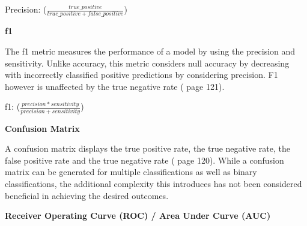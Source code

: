 Precision: (\(\frac{true\_positive}{true\_positive + false\_positive}\))

\textbf{f1}

The f1 metric measures the performance of a model by using the precision and sensitivity. Unlike accuracy, this metric considers null accuracy by decreasing with incorrectly classified positive predictions by considering precision. F1 however is unaffected by the true negative rate (\cite{Aurélien2017} page 121).

f1: (\(\frac{precision * sensitivity}{precision + sensitivity}\))

\textbf{Confusion Matrix}

A confusion matrix displays the true positive rate, the true negative rate, the false positive rate and the true negative rate (\cite{Aurélien2017} page 120). While a confusion matrix can be generated for multiple classifications as well as binary classifications, the additional complexity this introduces has not been considered beneficial in achieving the desired outcomes.


\textbf{Receiver Operating Curve (ROC) / Area Under Curve (AUC)}

